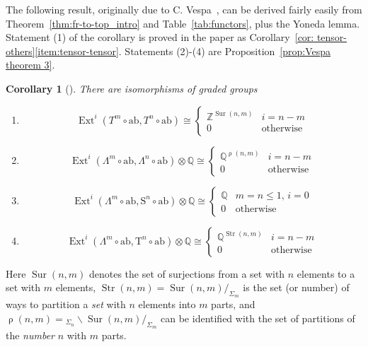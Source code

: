 \documentclass[psamsfonts]{amsart}
\theoremstyle{plain}
\newtheorem{cor}[thm]{Corollary}
\theoremstyle{definition}
\theoremstyle{remark}
\newcommand{\Z}{\mathbb{Z}}
\newcommand{\Q}{\mathbb{Q}}
\newcommand{\abelianization}{\mathrm{ab}}
\newcommand{\tensor}{\mathrm{T}}
\newcommand{\symm}{\mathrm{S}}
\DeclareMathOperator{\ext}{Ext}
\DeclareMathOperator{\sur}{Sur}
\DeclareMathOperator{\Part}{\rho}
\DeclareMathOperator{\Stirling}{Str}
\begin{document}
 The following result, originally due to C. Vespa~\cite{Vespa2018}, can be derived fairly easily from Theorem~\ref{thm:fr-to-top_intro} and Table~\ref{tab:functors}, plus the Yoneda lemma. Statement (1) of the corollary is proved in the paper as Corollary~\ref{cor: tensor-others}\ref{item:tensor-tensor}. Statements (2)-(4) are Proposition~\ref{prop:Vespa theorem 3}. %
\begin{cor}[\cite{Vespa2018}]\label{cor:previous}
There are isomorphisms of graded groups
\begin{enumerate}
\item 
\[
    \ext^i(T^m\circ \abelianization, T^n \circ \abelianization) \cong \left\{\begin{array}{cl} \Z^{\sur(n, m)} & i= n-m \\ 0 & \mbox{otherwise} \end{array}\right. 
\]
\item
\[
\ext^i(\Lambda^m\circ \abelianization, \Lambda^n \circ \abelianization)\otimes \Q \cong  
\left\{ \begin{array}{cl} \Q^{\Part(n, m)} & i=n-m \\ 0 &\mbox{otherwise} \end{array} \right.
\]
\item 
\[
\ext^i(\Lambda^m\circ \abelianization, \symm^n \circ \abelianization)\otimes \Q \cong  
\left\{\begin{array}{cc}
   \Q  & m=n\le 1, \, i=0  \\
   0  & \mbox{otherwise}
\end{array}\right. 
\]
\item \[
\ext^i(\Lambda^m\circ \abelianization, \tensor^n \circ \abelianization)\otimes \Q \cong  
   \left\{\begin{array}{cl} \Q^{\Stirling(n,m)} & i=n-m \\ 0 &\mbox{otherwise} \end{array}\right.
\]
\end{enumerate}
\end{cor}
Here $\sur(n, m)$ denotes the set of surjections from a set with $n$ elements to a set with $m$ elements, $\Stirling(n, m)=\sur(n,m)/_{\Sigma_m}$ is the set (or number) of ways to partition a \emph{set} with $n$ elements into $m$ parts, and $\Part(n,m)= {_{\Sigma_n}}\!\backslash\sur(n, m)/_{\Sigma_m}$ can be identified with the set of partitions of the \emph{number} $n$ with $m$ parts. %
\end{document}
